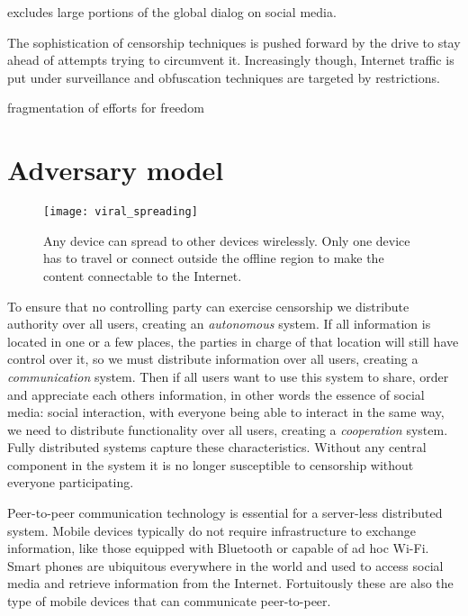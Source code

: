  excludes large portions of the global dialog on social media.




The sophistication of censorship techniques is pushed forward by the drive to stay ahead of attempts trying to circumvent it.
Increasingly though, Internet traffic is put under surveillance and obfuscation techniques are targeted by restrictions.


fragmentation of efforts for freedom


\section{Adversary model}
\pagebreak

\begin{figure}[h]
	\centering
	\texttt{[image: viral\_spreading]}
	\caption{Any device can spread to other devices wirelessly.
		Only one device has to travel or connect outside the offline region to make the content connectable to the Internet.}
	\label{fig:viral_spreading}
\end{figure}



To ensure that no controlling party can exercise censorship we distribute authority over all users, creating an \emph{autonomous} system.
If all information is located in one or a few places, the parties in charge of that location will still have control over it, so we must distribute information over all users, creating a \emph{communication} system.
Then if all users want to use this system to share, order and appreciate each others information, in other words the essence of social media: social interaction, with everyone being able to interact in the same way, we need to  distribute functionality over all users, creating a \emph{cooperation} system.
Fully distributed systems capture these characteristics. %
Without any central component in the system it is no longer susceptible to censorship without everyone participating.

Peer-to-peer communication technology is essential for a server-less distributed system.
Mobile devices typically do not require infrastructure to exchange information, like those equipped with Bluetooth or capable of ad hoc Wi-Fi.
Smart phones are ubiquitous everywhere in the world and used to access social media and retrieve information from the Internet.
Fortuitously these are also the type of mobile devices that can communicate peer-to-peer.

